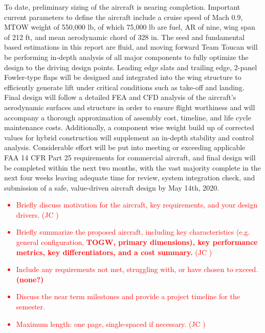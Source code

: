 To date, preliminary sizing of the aircraft is nearing completion.  Important current parameters to define the aircraft include a cruise speed of Mach 0.9, MTOW weight of 550,000 lb, of which 75,000 lb are fuel, AR of nine, wing span of 212 ft, and mean aerodynamic chord of 328 in. The seed and fundamental based estimations in this report are fluid, and moving forward Team Toucan will be performing in-depth analysis of all major components to fully optimize the design to the driving design points.  Leading edge slats and trailing edge, 2-panel Fowler-type flaps will be designed and integrated into the wing structure to efficiently generate lift under critical conditions such as take-off and landing.  Final design will follow a detailed FEA and CFD analysis of the aircraft's aerodynamic surfaces and structure in order to ensure flight worthiness and will accompany a thorough approximation of assembly cost, timeline, and life cycle maintenance costs.  Additionally, a component wise weight build up of corrected values for hybrid construction will supplement an in-depth stability and control analysis.  Considerable effort will be put into meeting or exceeding applicable FAA 14 CFR Part 25 requirements for commercial aircraft, and final design will be completed within the next two months, with the vast majority complete in the next four weeks leaving adequate time for review, system integration check, and submission of a safe, value-driven aircraft design by May 14th, 2020.

\textcolor{red}{
\begin{itemize}
    \item Briefly discuss motivation for the aircraft, key requirements, and your design drivers. (JC \checkmark)
    \item Briefly  summarize the proposed aircraft, including key  characteristics (e.g. general configuration, \textbf{TOGW, primary dimensions), key performance metrics, key differentiators, and a cost summary.} (JC \checkmark)
    \item Include any requirements not met, struggling with, or have chosen to exceed. \textbf{(none?)}
    \item Discuss the near term milestones and provide a project timeline for the semester. 
    \item Maximum length: one page, single-spaced if necessary. (JC \checkmark)
\end{itemize}}